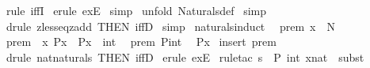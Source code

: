 \begin{isabellebody}
%
\isadelimproof
%
\endisadelimproof
%
\isatagproof
{}\isamarkupfalse%
\ {\isacharparenleft}rule\ iffI{\isacharparenright}\isanewline
{}\isamarkupfalse%
\ {\isacharparenleft}erule\ exE{\isacharparenright}\isanewline
{}\isamarkupfalse%
\ simp\isanewline
{}\isamarkupfalse%
\ {\isacharparenleft}unfold\ Naturals{\isacharunderscore}def{\isacharparenright}\isanewline
{}\isamarkupfalse%
\ simp\isanewline
{}\isamarkupfalse%
\ {\isacharparenleft}drule\ zless{\isacharunderscore}eq{\isacharunderscore}zadd\ {\isacharbrackleft}THEN\ iffD{}{\isacharbrackright}{\isacharparenright}\isanewline
{}\isamarkupfalse%
\ simp\isanewline
{}\isamarkupfalse%
%
\endisatagproof
{\isafoldproof}%
%
\isadelimproof
\isanewline
%
\endisadelimproof
\isanewline
\isanewline
\isanewline
{}\isamarkupfalse%
\ naturals{\isacharunderscore}induct{\isacharcolon}\ \isanewline
{}\ prem{}{\isacharcolon}\ {\isachardoublequoteopen}x\ {\isacharcolon}\ {\isacharpercent}N{\isachardoublequoteclose}\isanewline
{}\ prem{}{\isacharcolon}\ {\isachardoublequoteopen}{\isacharbang}{\isacharbang}\ x{\isachardot}\ P{\isacharparenleft}x{\isacharparenright}\ {\isacharequal}{\isacharequal}{\isachargreater}\ P{\isacharparenleft}x\ {\isacharplus}\ int\ {}{\isacharparenright}{\isachardoublequoteclose}\isanewline
{}\ prem{}{\isacharcolon}\ {\isachardoublequoteopen}P{\isacharparenleft}int\ {}{\isacharparenright}{\isachardoublequoteclose}\isanewline
{}\ {\isachardoublequoteopen}P{\isacharparenleft}x{\isacharparenright}{\isachardoublequoteclose}\isanewline
%
\isadelimproof
%
\endisadelimproof
%
\isatagproof
{}\isamarkupfalse%
\ {\isacharparenleft}insert\ prem{}{\isacharparenright}\isanewline
{}\isamarkupfalse%
\ {\isacharparenleft}drule\ nat{}naturals\ {\isacharbrackleft}THEN\ iffD{}{\isacharbrackright}{\isacharparenright}\isanewline
{}\isamarkupfalse%
\ {\isacharparenleft}erule\ exE{\isacharparenright}\isanewline
{}\isamarkupfalse%
\ {\isacharparenleft}rule{\isacharunderscore}tac\ s\ {\isacharequal}\ {\isachardoublequoteopen}P\ {\isacharparenleft}int\ xnat{\isacharparenright}{\isachardoublequoteclose}\ \ subst{\isacharparenright}\isanewline
{}\isamarkupfalse%
\ {}\isanewline
{}\isamarkupfalse%

\end{isabellebody}
